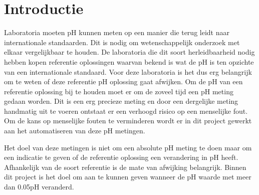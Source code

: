\section{Introductie}

Laboratoria moeten pH kunnen meten op een manier die terug leidt naar internationale standaarden. Dit is nodig om wetenschappelijk onderzoek met elkaar vergelijkbaar te houden. De laboratoria die dit soort herleidbaarheid nodig hebben kopen referentie oplossingen waarvan bekend is wat de pH is ten opzichte van een internationale standaard. Voor deze laboratoria is het dus erg belangrijk om te weten of deze referentie pH oplossing gaat afwijken. Om de pH van een referentie oplossing bij te houden moet er om de zoveel tijd een pH meting gedaan worden. Dit is een erg precieze meting en door een dergelijke meting handmatig uit te voeren ontstaat er een verhoogd risico op een menselijke fout. Om de kans op menselijke fouten te verminderen wordt er in dit project gewerkt aan het automatiseren van deze pH metingen. 

Het doel van deze metingen is niet om een absolute pH meting te doen maar om een indicatie te geven of de referentie oplossing een verandering in pH heeft. Afhankelijk van de soort referentie is de mate van afwijking belangrijk. Binnen dit project is het doel om aan te kunnen geven wanneer de pH waarde met meer dan 0.05pH veranderd.